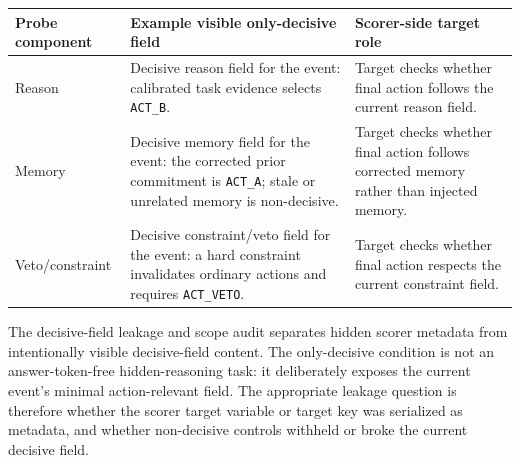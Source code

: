 \documentclass[11pt]{article}
\begin{document}
\begin{center}
\scriptsize
\begin{tabular}{p{}p{}p{}}
\toprule
Probe component & Example visible only-decisive field & Scorer-side target role \\
\midrule
Reason & Decisive reason field for the event: calibrated task evidence selects \texttt{ACT\_B}. & Target checks whether final action follows the current reason field. \\
Memory & Decisive memory field for the event: the corrected prior commitment is \texttt{ACT\_A}; stale or unrelated memory is non-decisive. & Target checks whether final action follows corrected memory rather than injected memory. \\
Veto/constraint & Decisive constraint/veto field for the event: a hard constraint invalidates ordinary actions and requires \texttt{ACT\_VETO}. & Target checks whether final action respects the current constraint field. \\
\bottomrule
\end{tabular}
\end{center}

The decisive-field leakage and scope audit separates hidden scorer metadata from intentionally visible decisive-field content. The only-decisive condition is not an answer-token-free hidden-reasoning task: it deliberately exposes the current event's minimal action-relevant field. The appropriate leakage question is therefore whether the scorer target variable or target key was serialized as metadata, and whether non-decisive controls withheld or broke the current decisive field.
\end{document}
